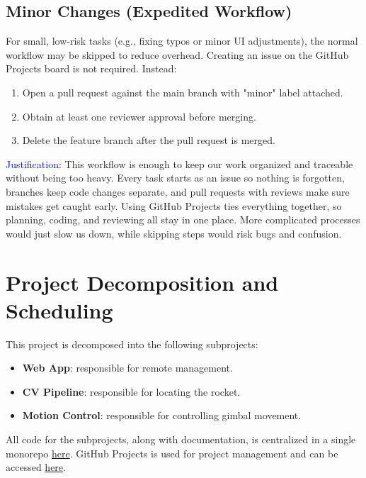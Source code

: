 \documentclass{article}
\begin{document}
\subsection{Minor Changes (Expedited Workflow)}

For small, low-risk tasks (e.g., fixing typos or minor UI adjustments), the
normal workflow may be skipped to reduce overhead. Creating an issue on the
GitHub Projects board is not required. Instead:
\begin{enumerate}
  \item Open a pull request against the main branch with "minor" label attached.
  \item Obtain at least one reviewer approval before merging.
  \item Delete the feature branch after the pull request is merged.
\end{enumerate}

\textcolor{blue}{Justification:} This workflow is enough to keep our work organized
and traceable without being too heavy. Every task starts as an issue so nothing
is forgotten, branches keep code changes separate, and pull requests with reviews
make sure mistakes get caught early. Using GitHub Projects ties everything together,
so planning, coding, and reviewing all stay in one place. More complicated processes
would just slow us down, while skipping steps would risk bugs and confusion.

\section{Project Decomposition and Scheduling}

This project is decomposed into the following subprojects:

\begin{itemize}
  \item \textbf{Web App}: responsible for remote management.
  \item \textbf{CV Pipeline}: responsible for locating the rocket.
  \item \textbf{Motion Control}: responsible for controlling gimbal movement.
\end{itemize}

All code for the subprojects, along with documentation, is centralized in a
single monorepo \href{https://github.com/ZifanSi/vision-guided-tracker}{here}.
GitHub Projects is used for project management and can be accessed
\href{https://github.com/users/ZifanSi/projects/1}{here}.
\end{document}
